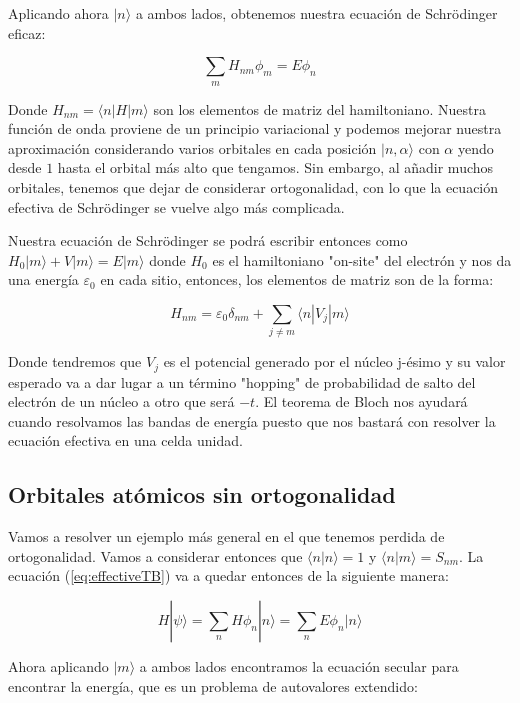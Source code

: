 \documentclass{article} %
\begin{document}
Aplicando ahora $|n\rangle$ a ambos lados, obtenemos nuestra ecuación de Schrödinger eficaz:

\begin{equation}
\sum_m H_{nm} \phi_m = E\phi_n
\label{eq:effectiveTB}
\end{equation}

Donde $H_{nm} = \langle n | H | m \rangle$ son los elementos de matriz del hamiltoniano. Nuestra función de onda proviene de un principio variacional y podemos mejorar nuestra aproximación considerando varios orbitales en cada posición $|n, \alpha\rangle$ con $\alpha$ yendo desde $1$ hasta el orbital más alto que tengamos. Sin embargo, al añadir muchos orbitales, tenemos que dejar de considerar ortogonalidad, con lo que la ecuación efectiva de Schrödinger se vuelve algo más complicada.

Nuestra ecuación de Schrödinger se podrá escribir entonces como $H_0|m\rangle + V|m\rangle = E|m\rangle$ donde $H_0$ es el hamiltoniano "on-site" del electrón y nos da una energía $\varepsilon_0$ en cada sitio, entonces, los elementos de matriz son de la forma:

\begin{equation}
H_{nm} = \varepsilon_0 \delta_{nm} + \sum_{j \neq m} \langle n | V_j | m \rangle
\label{eq:hamElem}
\end{equation}

Donde tendremos que $V_j$ es el potencial generado por el núcleo j-ésimo y su valor esperado va a dar lugar a un término "hopping" de probabilidad de salto del electrón de un núcleo a otro que será $-t$. El teorema de Bloch nos ayudará cuando resolvamos las bandas de energía puesto que nos bastará con resolver la ecuación efectiva en una celda unidad.

\subsection{Orbitales atómicos sin ortogonalidad}

Vamos a resolver un ejemplo más general en el que tenemos perdida de ortogonalidad. Vamos a considerar entonces que $\langle n | n \rangle = 1$ y $\langle n | m \rangle = S_{nm}$. La ecuación (\ref{eq:effectiveTB}) va a quedar entonces de la siguiente manera:

$$
H|\psi\rangle = \sum_n H\phi_n|n\rangle = \sum_n E \phi_n |n\rangle
$$

Ahora aplicando $|m\rangle$ a ambos lados encontramos la ecuación secular para encontrar la energía, que es un problema de autovalores extendido:
\end{document}
